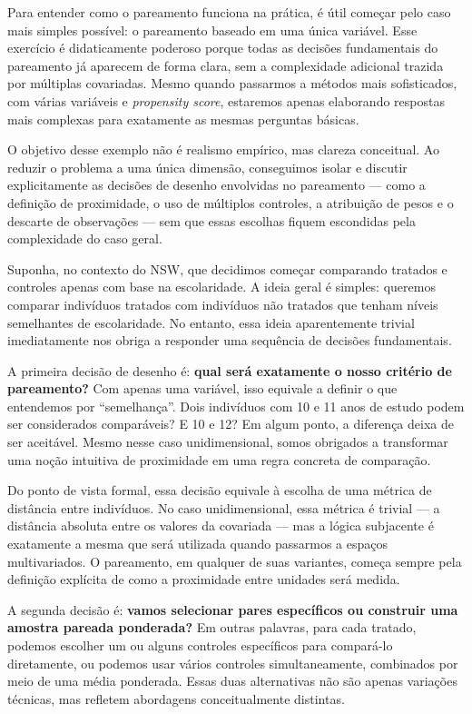 Para entender como o pareamento funciona na prática, é útil começar pelo caso mais simples possível: o pareamento baseado em uma única variável. Esse exercício é didaticamente poderoso porque todas as decisões fundamentais do pareamento já aparecem de forma clara, sem a complexidade adicional trazida por múltiplas covariadas. Mesmo quando passarmos a métodos mais sofisticados, com várias variáveis e \textit{propensity score}, estaremos apenas elaborando respostas mais complexas para exatamente as mesmas perguntas básicas.

O objetivo desse exemplo não é realismo empírico, mas clareza conceitual. Ao reduzir o problema a uma única dimensão, conseguimos isolar e discutir explicitamente as decisões de desenho envolvidas no pareamento --- como a definição de proximidade, o uso de múltiplos controles, a atribuição de pesos e o descarte de observações --- sem que essas escolhas fiquem escondidas pela complexidade do caso geral.

Suponha, no contexto do NSW, que decidimos começar comparando tratados e controles apenas com base na escolaridade. A ideia geral é simples: queremos comparar indivíduos tratados com indivíduos não tratados que tenham níveis semelhantes de escolaridade. No entanto, essa ideia aparentemente trivial imediatamente nos obriga a responder uma sequência de decisões fundamentais.

A primeira decisão de desenho é: \textbf{qual será exatamente o nosso critério de pareamento?} Com apenas uma variável, isso equivale a definir o que entendemos por ``semelhança''. Dois indivíduos com 10 e 11 anos de estudo podem ser considerados comparáveis? E 10 e 12? Em algum ponto, a diferença deixa de ser aceitável. Mesmo nesse caso unidimensional, somos obrigados a transformar uma noção intuitiva de proximidade em uma regra concreta de comparação.

Do ponto de vista formal, essa decisão equivale à escolha de uma métrica de distância entre indivíduos. No caso unidimensional, essa métrica é trivial --- a distância absoluta entre os valores da covariada --- mas a lógica subjacente é exatamente a mesma que será utilizada quando passarmos a espaços multivariados. O pareamento, em qualquer de suas variantes, começa sempre pela definição explícita de como a proximidade entre unidades será medida.



A segunda decisão é: \textbf{vamos selecionar pares específicos ou construir uma amostra pareada ponderada?} Em outras palavras, para cada tratado, podemos escolher um ou alguns controles específicos para compará-lo diretamente, ou podemos usar vários controles simultaneamente, combinados por meio de uma média ponderada. Essas duas alternativas não são apenas variações técnicas, mas refletem abordagens conceitualmente distintas. 

